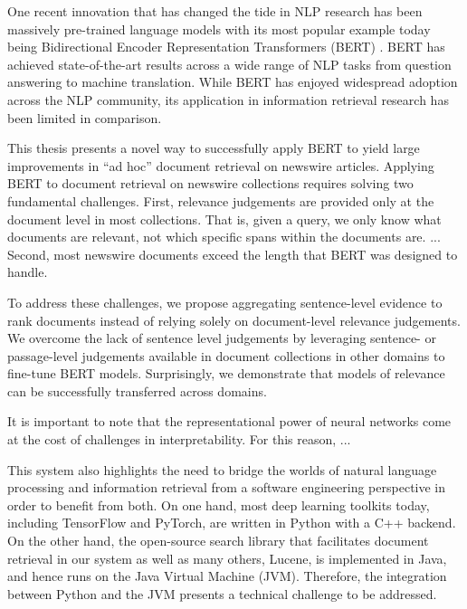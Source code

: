 One recent innovation that has changed the tide in NLP research has been massively pre-trained language models with its most popular example today being Bidirectional Encoder Representation Transformers (BERT) \cite{devlin2018bert}.
BERT has achieved state-of-the-art results across a wide range of NLP tasks from question answering to machine translation.
While BERT has enjoyed widespread adoption across the NLP community, its application in information retrieval research has been limited in comparison.


This thesis presents a novel way to successfully apply BERT to yield large improvements in ``ad hoc'' document retrieval on newswire articles.
Applying BERT to document retrieval on newswire collections requires solving two fundamental challenges.
First, relevance judgements are provided only at the document level in most collections.
That is, given a query, we only know what documents are relevant, not which specific spans within the documents are.
...
Second, most newswire documents exceed the length that BERT was designed to handle.

To address these challenges, we propose aggregating sentence-level evidence to rank documents instead of relying solely on document-level relevance judgements.
We overcome the lack of sentence level judgements by leveraging sentence- or passage-level judgements available in document collections in other domains to fine-tune BERT models.
Surprisingly, we demonstrate that models of relevance can be successfully transferred across domains.

It is important to note that the representational power of neural networks come at the cost of challenges in interpretability.
For this reason, ...

This system also highlights the need to bridge the worlds of natural language processing and information retrieval from a software engineering perspective in order to benefit from both.
On one hand, most deep learning toolkits today, including TensorFlow and PyTorch, are written in Python with a C++ backend.
On the other hand, the open-source search library that facilitates document retrieval in our system as well as many others, Lucene, is implemented in Java, and hence runs on the Java Virtual Machine (JVM).
Therefore, the integration between Python and the JVM presents a technical challenge to be addressed.


